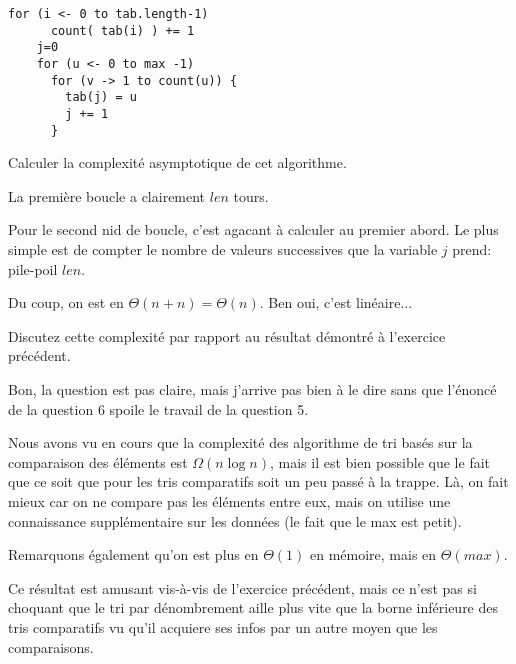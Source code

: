 \documentclass[10pt]{article}\usepackage[correction]{esial}
\begin{document}
\begin{Reponse}
  \begin{Verbatim}[gobble=4]
    for (i <- 0 to tab.length-1)
      count( tab(i) ) += 1
    j=0
    for (u <- 0 to max -1)
      for (v -> 1 to count(u)) {
        tab(j) = u
        j += 1 
      }
  \end{Verbatim}
\end{Reponse}

\Question Calculer la complexité asymptotique de cet algorithme.

\begin{Reponse}
  La première boucle a clairement $len$ tours. 
 
  Pour le second nid de boucle, c'est agacant à calculer au premier abord. Le
  plus simple est de compter le nombre de valeurs successives que la variable
  $j$ prend: pile-poil $len$.

  Du coup, on est en $\Theta(n+n)=\Theta(n)$. Ben oui, c'est linéaire...

\end{Reponse}

\Question Discutez cette complexité par rapport au résultat démontré à
l'exercice précédent.

\begin{Reponse}
  Bon, la question est pas claire, mais j'arrive pas bien à le dire sans que
  l'énoncé de la question 6 spoile le travail de la question 5.

  Nous avons vu en cours que la complexité des algorithme de tri basés sur la
  comparaison des éléments est $\Omega(n\log n)$, mais il est bien possible que
  le fait que ce soit que pour les tris comparatifs soit un peu passé à la
  trappe. Là, on fait mieux car on ne compare pas les éléments entre eux, mais
  on utilise une connaissance supplémentaire sur les données (le fait que le
  max est petit).

  Remarquons également qu'on est plus en $\Theta(1)$ en mémoire, mais en
  $\Theta(max)$.
  \bigskip

  Ce résultat est amusant vis-à-vis de l'exercice précédent, mais ce n'est pas
  si choquant que le tri par dénombrement aille plus vite que la borne
  inférieure des tris comparatifs vu qu'il acquiere ses infos par un autre
  moyen que les comparaisons.
\end{Reponse}
\end{document}
